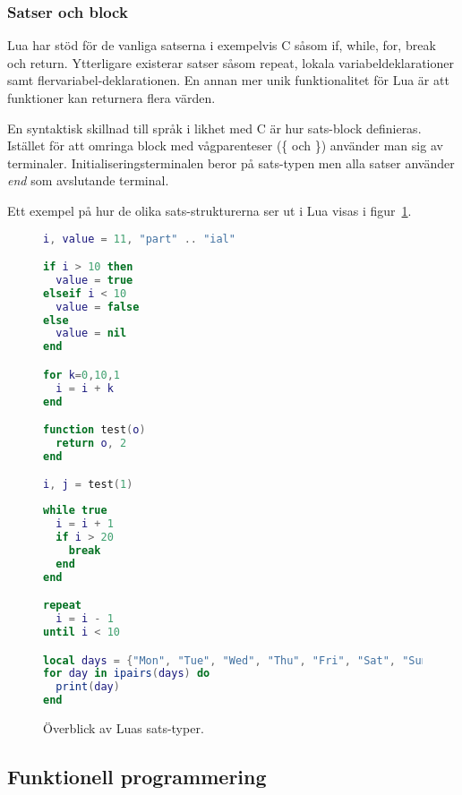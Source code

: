 \subsubsection{Satser och block}

Lua har stöd för de vanliga satserna i exempelvis C såsom if, while, for,
break och return. Ytterligare existerar satser såsom repeat, lokala
variabeldeklarationer samt flervariabel-deklarationen. En annan mer unik
funktionalitet för Lua är att funktioner kan returnera flera värden.

En syntaktisk skillnad till språk i likhet med C är hur sats-block definieras.
Istället för att omringa block med vågparenteser (\{ och \}) använder man sig
av terminaler. Initialiseringsterminalen beror på sats-typen men alla satser
använder \textit{end} som avslutande terminal.

Ett exempel på hur de olika sats-strukturerna ser ut i Lua visas i
figur~\ref{fig:luacode}.

\begin{figure}[ht]
  \begin{minipage}[t]{0.5\textwidth}
\begin{lstlisting}[language=Lua]
i, value = 11, "part" .. "ial"

if i > 10 then
  value = true
elseif i < 10
  value = false
else
  value = nil
end

for k=0,10,1
  i = i + k
end

function test(o)
  return o, 2
end

i, j = test(1)
\end{lstlisting}
  \end{minipage}
  \begin{minipage}[t]{0.5\textwidth}
\begin{lstlisting}[language=Lua]
while true
  i = i + 1
  if i > 20
    break
  end
end

repeat
  i = i - 1
until i < 10

local days = {"Mon", "Tue", "Wed", "Thu", "Fri", "Sat", "Sun"}
for day in ipairs(days) do
  print(day)
end
\end{lstlisting}
  \end{minipage}
  \caption{Överblick av Luas sats-typer.}
  \label{fig:luacode}
\end{figure}

\subsection{Funktionell programmering}

